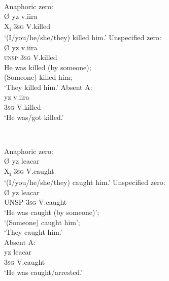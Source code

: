 \documentclass[output=collectionpaper]{langsci/langscibook}
\begin{document}
\ea
\label{ex:Nich:21}
\footnotemark{} \\
\begin{xlist}
\ex
Anaphoric zero:	\\
\gll Ø 	yz  	v.iira\\
X\textsubscript{i}	\textsc{3sg}	V.killed\\
\glt `(I/you/he/she/they) killed him.'
\ex
Unspecified zero:\\
\gll Ø	 yz	v.iira\\
\textsc{unsp}	\textsc{3sg}	V.killed\\
\glt He was killed (by someone);\\
(Someone) killed him;\\
`They killed him.'
\ex
Absent A:	\\
\gll yz   	v.iira\\
\textsc{3sg}	V.killed\\
\glt `He was/got killed.'\\
\end{xlist}
\z
{}

\ea
\label{ex:Nich:22}
 \\
\begin{xlist}
\ex
Anaphoric zero:\\
\gll	Ø	yz  	leacar\\
X\textsubscript{i}	\textsc{3sg}	V.caught \\
\glt `(I/you/he/she/they) caught him.'
\ex
Unspecified zero: \\
\gll Ø	 yz	leacar\\
UNSP	\textsc{3sg}	V.caught\\
\glt	`He was caught (by someone)';\\
`(Someone) caught him';\\
`They caught him.'\\
\ex
Absent A:\\
\gll yz   	leacar\\
\textsc{3sg}	V.caught \\
\glt `He was caught/arrested.'
\end{xlist}
\z
\end{document}
